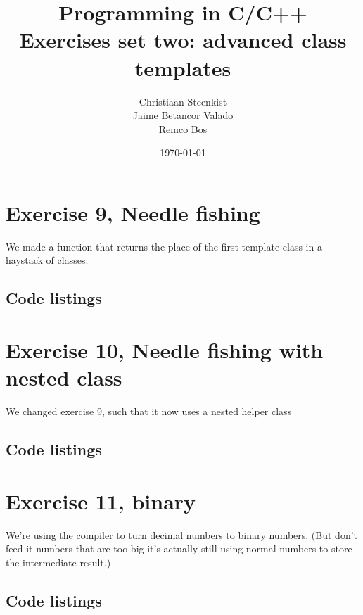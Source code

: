 \documentclass[11pt]{article}
\begin{document}
\title{Programming in C/C++ \\
       Exercises set two: advanced class templates
}
\date{\today}
\author{Christiaan Steenkist \\
Jaime Betancor Valado \\
Remco Bos \\
}

\maketitle
\section*{Exercise 9, Needle fishing}
We made a function that returns the place of the first template class in a haystack of classes.

\subsection*{Code listings}



\section*{Exercise 10, Needle fishing with nested class}
We changed exercise 9, such that it now uses a nested helper class

\subsection*{Code listings}



\section*{Exercise 11, binary}
We're using the compiler to turn decimal numbers to binary numbers. (But don't feed it numbers that are too big it's actually still using normal numbers to store the intermediate result.)

\subsection*{Code listings}



\end{document}
